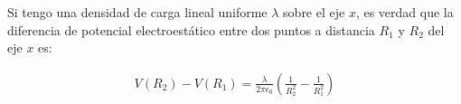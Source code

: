 \documentclass[12pt]{article}
\begin{document}
Si tengo una densidad de carga lineal uniforme $\lambda$ sobre el eje $x$, es
verdad que la diferencia de potencial electroestático entre dos puntos a
distancia $R_1$ y $R_2$ del eje $x$ es:

\begin{align*}
    V(R_2)-V(R_1)=\frac{\lambda}{2\pi\epsilon_0}\left(\frac{1}{R_2^2}-\frac{1}{R_1^2}\right)
\end{align*}
\end{document}
